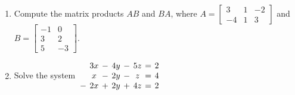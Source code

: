 \documentclass[12pt]{article}
\newcommand{\points}[1]{\marginpar{\hspace{24pt}[#1]}}
\begin{document}
\begin{enumerate}
\item Compute the matrix products $AB$ and $BA$, where $A = \begin{bmatrix}3&1&-2\\-4&1&3\end{bmatrix}$ and $B = \begin{bmatrix}-1&0\\3&2\\5&-3\end{bmatrix}$.\points{8}

\pagebreak

\item Solve the system \hspace{12pt} $\arraycolsep=2pt \begin{array}{cccccccc}&3x&-&4y&-&5z&=&2\\
 &x&-&2y&-&z&=&4\\
-&2x&+&2y&+&4z&=&2\end{array}$ \points{8}
\end{enumerate}
\end{document}
